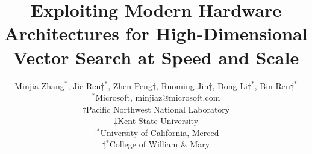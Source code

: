 \documentclass[11pt]{article}
\begin{document}
\title{Exploiting Modern Hardware Architectures for High-Dimensional Vector Search at Speed and Scale}

\author{Minjia Zhang$^*$, Jie Ren$\ddagger$$^*$, Zhen Peng$\dagger$, Ruoming Jin$\ddagger$, Dong Li$\dagger$$^*$, Bin Ren$\ddagger$$^*$\\
  $^*$Microsoft, minjiaz@microsoft.com \\
  $\dagger$Pacific Northwest National Laboratory \\
  $\ddagger$Kent State University\\
  $\dagger$$^*$University of California, Merced \\
  $\ddagger$$^*$College of William \& Mary
}


\maketitle
\renewcommand\thesection{\arabic{section}}
\setcounter{section}{0}
\setcounter{figure}{0}
\setcounter{table}{0}




% 




% 


%


% 


\small
\end{document}
